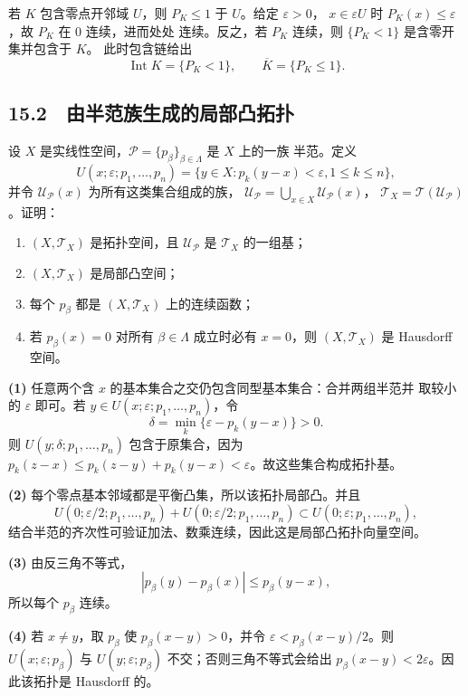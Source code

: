 若 $K$ 包含零点开邻域 $U$，则 $P_K\le1$ 于 $U$。给定 $\varepsilon>0$，
$x\in\varepsilon U$ 时 $P_K(x)\le\varepsilon$，故 $P_K$ 在 $0$ 连续，进而处处
连续。反之，若 $P_K$ 连续，则 $\{P_K<1\}$ 是含零开集并包含于 $K$。
此时包含链给出
\[
 \operatorname{Int}K=\{P_K<1\},\qquad
 \overline K=\{P_K\le1\}.
\]

\subsection*{15.2　由半范族生成的局部凸拓扑}

\begin{problem}
设 $X$ 是实线性空间，$\mathcal P=\{p_\beta\}_{\beta\in\Lambda}$ 是 $X$ 上的一族
半范。定义
\[
 U(x;\varepsilon;p_1,\dots,p_n)
 =\{y\in X:p_k(y-x)<\varepsilon, 1\le k\le n\},
\]
并令 $\mathcal U_{\mathcal P}(x)$ 为所有这类集合组成的族，
$\mathcal U_{\mathcal P}=\bigcup_{x\in X}\mathcal U_{\mathcal P}(x)$，
$\mathcal T_X=\mathcal T(\mathcal U_{\mathcal P})$。证明：
\begin{enumerate}
 \item $(X,\mathcal T_X)$ 是拓扑空间，且 $\mathcal U_{\mathcal P}$ 是
 $\mathcal T_X$ 的一组基；
 \item $(X,\mathcal T_X)$ 是局部凸空间；
 \item 每个 $p_\beta$ 都是 $(X,\mathcal T_X)$ 上的连续函数；
 \item 若 $p_\beta(x)=0$ 对所有 $\beta\in\Lambda$ 成立时必有 $x=0$，则
 $(X,\mathcal T_X)$ 是 Hausdorff 空间。
\end{enumerate}
\end{problem}

\textbf{(1)} 任意两个含 $x$ 的基本集合之交仍包含同型基本集合：合并两组半范并
取较小的 $\varepsilon$ 即可。若
$y\in U(x;\varepsilon;p_1,\dots,p_n)$，令
\[
 \delta=\min_k\{\varepsilon-p_k(y-x)\}>0.
\]
则 $U(y;\delta;p_1,\dots,p_n)$ 包含于原集合，因为
$p_k(z-x)\le p_k(z-y)+p_k(y-x)<\varepsilon$。故这些集合构成拓扑基。

\textbf{(2)} 每个零点基本邻域都是平衡凸集，所以该拓扑局部凸。并且
\[
 U(0;\varepsilon/2;p_1,\dots,p_n)+U(0;\varepsilon/2;p_1,\dots,p_n)
 \subset U(0;\varepsilon;p_1,\dots,p_n),
\]
结合半范的齐次性可验证加法、数乘连续，因此这是局部凸拓扑向量空间。

\textbf{(3)} 由反三角不等式，
\[
 |p_\beta(y)-p_\beta(x)|\le p_\beta(y-x),
\]
所以每个 $p_\beta$ 连续。

\textbf{(4)} 若 $x\ne y$，取 $p_\beta$ 使 $p_\beta(x-y)>0$，并令
$\varepsilon<p_\beta(x-y)/2$。则
$U(x;\varepsilon;p_\beta)$ 与 $U(y;\varepsilon;p_\beta)$ 不交；否则三角不等式会给出
$p_\beta(x-y)<2\varepsilon$。因此该拓扑是 Hausdorff 的。

